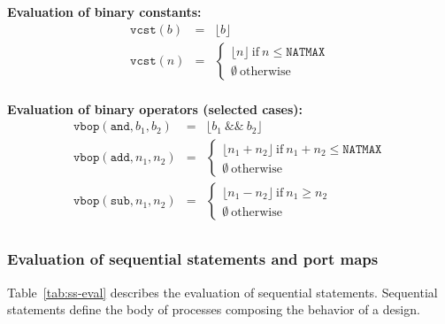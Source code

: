 \documentclass[pdflatex,sn-mathphys]{sn-jnl}%
\theoremstyle{thmstyleone}%
\theoremstyle{thmstyletwo}%
\theoremstyle{thmstylethree}%
\begin{document}
\begin{table}[!t]
  \vspace{10pt}

  \textbf{Evaluation of binary constants:}
  \begin{eqnarray*}
    \label{eq:vcst}
    \mathtt{vcst}(b) & = & \lfloor{}b\rfloor \\
    \mathtt{vcst}(n) & = & \begin{cases}
                             \lfloor{}n\rfloor~\mathrm{if}~n\le\mathtt{NATMAX} \\
                             \emptyset~\mathrm{otherwise} \end{cases} \\
  \end{eqnarray*}
  
  \textbf{Evaluation of binary operators (selected cases):}
  \begin{eqnarray*}
    \label{eq:vbop}
    \mathtt{vbop}(\mathtt{and}, b_1, b_2) & = & \lfloor{}b_1~\&\&~b_2\rfloor \\
    \mathtt{vbop}(\mathtt{add}, n_1, n_2) & = & \begin{cases}
                                                  \lfloor{}n_1+n_2\rfloor~\mathrm{if}~n_1+n_2\le\mathtt{NATMAX} \\
                                                  \emptyset~\mathrm{otherwise} \end{cases} \\
    \mathtt{vbop}(\mathtt{sub}, n_1, n_2) & = & \begin{cases}
                                                  \lfloor{}n_1-n_2\rfloor~\mathrm{if}~n_1\ge{}n_2 \\
                                                  \emptyset~\mathrm{otherwise}
                                                \end{cases} \\
  \end{eqnarray*}
  
\end{table}

\subsubsection{Evaluation of sequential statements and port maps}
\label{subsubsec:ss-and-port-map-eval}

Table~\ref{tab:ss-eval} describes the evaluation of sequential
statements. Sequential statements define the body of processes
composing the behavior of a \hvhdl{} design.
\end{document}
